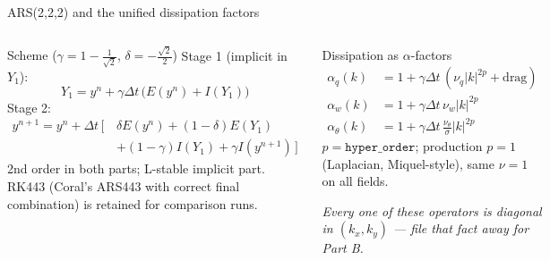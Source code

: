 \documentclass[aspectratio=169,10pt]{beamer}
\begin{document}
\begin{frame}{ARS(2,2,2) and the unified dissipation factors}
  \begin{columns}[T]
    \begin{block}{Scheme ($\gamma = 1-\tfrac{1}{\sqrt2}$, $\delta = -\tfrac{\sqrt2}{2}$)}
      \small
      Stage 1 (implicit in $Y_1$):
      \[
        Y_1 = y^n + \gamma\Delta t\,\bigl(E(y^n) + I(Y_1)\bigr)
      \]
      Stage 2:
      \begin{align*}
        y^{n+1} = y^n + \Delta t\,\bigl[\,&\delta E(y^n) + (1{-}\delta)E(Y_1) \\
        &+ (1{-}\gamma) I(Y_1) + \gamma I(y^{n+1})\,\bigr]
      \end{align*}
      2nd order in both parts; L-stable implicit part.
      RK443 (Coral's ARS443 with correct final combination) is retained for
      comparison runs.
    \end{block}
    \begin{block}{Dissipation as $\alpha$-factors}
      \small
      \begin{align*}
        \alpha_q(k) &= 1 + \gamma\Delta t\,(\nu_q |k|^{2p} + \text{drag})\\
        \alpha_w(k) &= 1 + \gamma\Delta t\,\nu_w |k|^{2p}\\
        \alpha_\theta(k) &= 1 + \gamma\Delta t\,\tfrac{\nu_\theta}{\sigma}|k|^{2p}
      \end{align*}
      $p = \texttt{hyper\_order}$; production $p=1$ (Laplacian, Miquel-style),
      same $\nu=1$ on all fields.
      \par\smallskip
      \emph{Every one of these operators is diagonal in $(k_x,k_y)$ --- file that
      fact away for Part B.}
    \end{block}
  \end{columns}
\end{frame}
\end{document}
